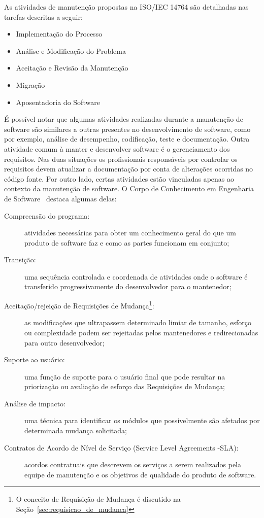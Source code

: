 As atividades de manutenção propostas na ISO/IEC 14764 são detalhadas nas
tarefas descritas a seguir:

\begin{itemize}
   	\item Implementação do Processo
   	\item Análise e Modificação do
		Problema
	\item Aceitação e Revisão da Manutenção
   	\item Migração
   	\item Aposentadoria do Software
\end{itemize}

É possível notar que algumas atividades realizadas durante a manutenção de
software são similares a outras presentes no desenvolvimento de software, como
por exemplo, análise de desempenho, codificação, teste e documentação. Outra
atividade comum à manter e desenvolver software é o gerenciamento dos
requisitos. Nas duas situações os profissionais responsáveis por controlar os
requisitos devem atualizar a do\-cu\-men\-ta\-ção  por conta de alterações
ocorridas no código fonte. Por outro lado, certas atividades estão vinculadas
apenas ao contexto da manutenção de software. O Corpo de Conhecimento em
Engenharia de Software~\cite{4425813} destaca algumas delas:

\begin{description}
	\item[Compreensão do programa:] atividades necessárias para obter um
		conhecimento geral do que um produto de software faz e como as partes
		funcionam em conjunto;
	\item[Transição:] uma sequência controlada e coordenada de atividades onde o
		software é transferido progressivamente do desenvolvedor para o
		mantenedor;
    \item[Aceitação/rejeição de Requisições de Mudança\footnote{O conceito de
            Requisição de Mudança é discutido na
            Seção~\ref{sec:requisicao_de_mudanca}}:] as modificações que
        ultrapassem determinado limiar de tamanho, esforço ou complexidade podem
        ser rejeitadas pelos mantenedores e redirecionadas para outro
        desenvolvedor;
	\item[Suporte ao usuário:] uma função de suporte para o usuário final que
		pode resultar na priorização ou avaliação de esforço das Requisições
		de Mudança;
	\item[Análise de impacto:] uma técnica para identificar os módulos que
		possivelmente são afetados por determinada mudança solicitada;
	\item[Contratos de Acordo de Nível de Serviço (Service Level Agreements
		\@-\@ SLA):] acordos contratuais que descrevem os serviços a serem
		realizados pela equipe de manutenção e os objetivos de qualidade do
		produto de software.
\end{description}

